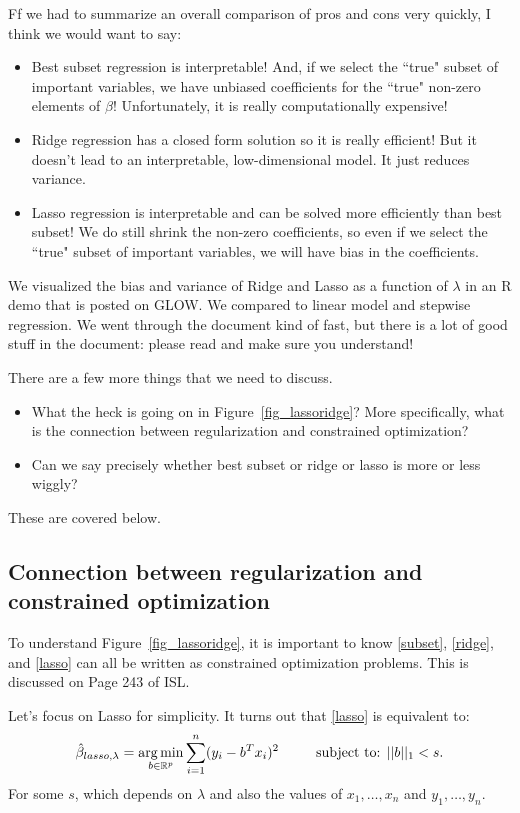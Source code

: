 Ff we had to summarize an overall comparison of pros and cons very quickly, I think we would want to say:
\begin{itemize}
\item Best subset regression is interpretable! And, if we select the ``true" subset of important variables, we have unbiased coefficients for the ``true" non-zero elements of $\beta$! Unfortunately, it is really computationally expensive!
\item Ridge regression has a closed form solution so it is really efficient! But it doesn't lead to an interpretable, low-dimensional model. It just reduces variance.
\item Lasso regression is interpretable and can be solved more efficiently than best subset! We do still shrink the non-zero coefficients, so even if we select the ``true" subset of important variables, we will have bias in the coefficients. 
\end{itemize}

We visualized the bias and variance of Ridge and Lasso as a function of $\lambda$ in an R demo that is posted on GLOW. We compared to linear model and stepwise regression. We went through the document kind of fast, but there is a lot of good stuff in the document: please read and make sure you understand!

There are a few more things that we need to discuss.
\begin{itemize}
\item What the heck is going on in Figure~\ref{fig_lassoridge}? More specifically, what is the connection between regularization and constrained optimization?
\item Can we say precisely whether best subset or ridge or lasso is more or less wiggly?	
\end{itemize}
These are covered below. 

\subsection{Connection between regularization and constrained optimization}

To understand Figure~\ref{fig_lassoridge}, it is important to know \eqref{subset}, \eqref{ridge},  and \eqref{lasso} can all be written as constrained optimization problems. This is discussed on Page 243 of ISL.

Let's focus on Lasso for simplicity. It turns out that \eqref{lasso} is equivalent to:
$$
\hat{\beta}_{lasso,\lambda}  = \argmin_{b \in \mathbb{R}^p} \sum_{i=1}^n 	(y_i - b^T x_i)^2 \ \ \ \ \ \ \ \text{        subject to:     } ||b||_1 < s. 
$$
For some $s$, which depends on $\lambda$ and also the values of $x_1,\ldots, x_n$ and $y_1,\ldots,y_n$. 

